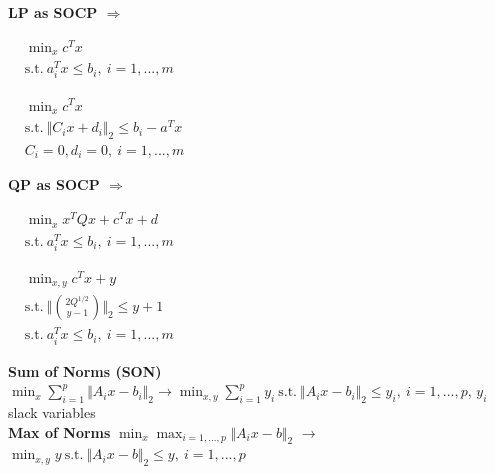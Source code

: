 \documentclass[a4paper]{article}
\begin{document}
\begin{multicols}{4}
    \noindent
    \textbf{LP as SOCP $\Longrightarrow$}
    \begin{center}
        $\begin{aligned}
            &\min_{x} c^T{x}\\
            &\text{s.t.} \ a_i^T{x}\le{b_i}, \ i=1,...,m
        \end{aligned}$
    \end{center}
    \newcolumn
    \begin{center}
        $\begin{aligned}
            &\min_{x} c^T{x}\\
            &\text{s.t.} \ \Vert C_i{x}+d_i \Vert_2 \le b_i-a^T{x}\\
            &C_i=0, d_i=0, \ i=1,...,m
        \end{aligned}$
    \end{center}
    \newcolumn
    \textbf{QP as SOCP $\Longrightarrow$}
    \begin{center}
        $\begin{aligned}
            &\min_{x} x^T{Q}x+c^T{x}+d\\
            &\text{s.t.} \ a_i^T{x} \le b_i, \ i=1,...,m
        \end{aligned}$
    \end{center}
    \newcolumn
    \begin{center}
        $\begin{aligned}
            &\min_{x,y} {c^T{x}+y}\\
            &\text{s.t.} \ \bigg\Vert\binom{2Q^{1/2}}{y-1} \bigg\Vert_2 \le y+1 \\
            &\text{s.t.} \ a_i^T{x} \le b_i, \ i=1,...,m
        \end{aligned}$
    \end{center}
\end{multicols}
\noindent
\textbf{Sum of Norms (SON)} $\min_{x} \sum_{i=1}^p \Vert A_i x - b_i\Vert_2 \longrightarrow 
\min_{x,y} {\sum_{i=1}^p{y_i}} \ \text{s.t.} \  \Vert A_i x - b_i\Vert_2 \le y_i, \ i=1,...,p$, $y_i$ slack variables\\
\textbf{Max of Norms} $\min_{x} \max_{i=1,...,p} \Vert A_i{x}-b \Vert_2$ $\longrightarrow$ $\min_{x,y} y \ \text{s.t.} \
\Vert A_i{x}-b \Vert_2 \le y, \ i=1,...,p$\\
\end{document}
